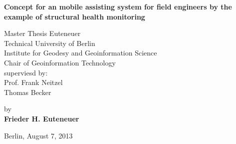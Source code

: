 \begin{center}
\vspace*{\fill}

    {\Large{\bf Concept for an mobile assisting system for field engineers by the example of structural health monitoring}} \vspace{0.5cm}


    {\normalsize Master Thesis Euteneuer}\\\vspace{0.5cm}
    {\normalsize Technical University of Berlin \\
    Institute for Geodesy and Geoinformation Science \\
	Chair of Geoinformation Technology\\
	superviesd by:\\	
	Prof. Frank Neitzel\\
	Thomas Becker}\vspace{1cm}

    {\normalsize by \\\vspace{0.5cm}
    {\bf Frieder H. Euteneuer}} \vspace{1cm}
		

    {\normalsize Berlin, August 7, 2013}
\vfill
\end{center}
